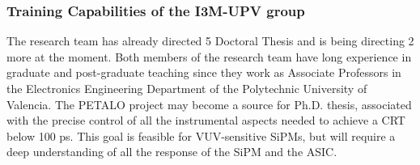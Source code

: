 %
%

\subsubsection*{Training Capabilities of the I3M-UPV group}
\par The research team has already directed 5 Doctoral Thesis and is being directing 2 more at the moment. Both members of the research team have long experience in graduate and post-graduate teaching since they work as Associate Professors in the Electronics Engineering Department of  the Polytechnic University of Valencia. The PETALO project may become a source for Ph.D. thesis, associated with the precise control of all the instrumental aspects needed to achieve a CRT below 100 ps. This goal is feasible for VUV-sensitive SiPMs, but will require a deep understanding of all the response of the SiPM and the ASIC. 


